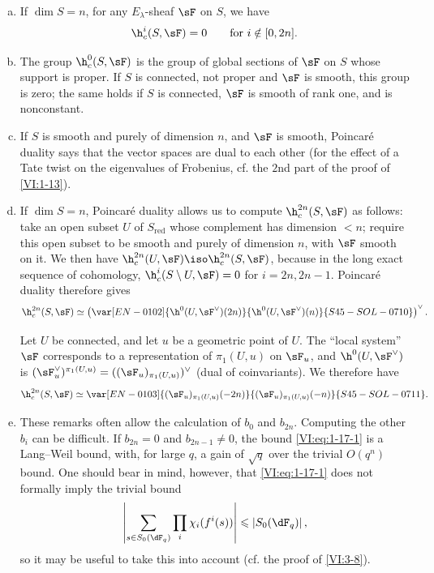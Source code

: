 \begin{enumerate}[a)]
  \item If $\dim S=n$, for any $E_\lambda$-sheaf $\sF$ on $S$, we have 
    \[
      \h_c^i(S,\sF) = 0 \qquad \text{for $i\notin [0,2n]$.}
    \]
  \item The group $\h_c^0(S,\sF)$ is the group of global sections of $\sF$ 
    on $S$ whose support is proper. If $S$ is connected, not proper and 
    $\sF$ is smooth, this group is zero; the same holds if $S$ is connected, 
    $\sF$ is smooth of rank one, and is nonconstant.
  \item If $S$ is smooth and purely of dimension $n$, and $\sF$ is smooth, 
    Poincaré duality says that the vector spaces 
     are dual to each other 
    (for the effect of a Tate twist on the eigenvalues of Frobenius, 
    cf. the $2$nd part of the proof of \ref{VI:1-13}).
  \item If $\dim S=n$, Poincaré duality allows us to compute 
    $\h_c^{2n}(S,\sF)$ as follows: take an open subset $U$ of $S_\text{red}$ 
    whose complement has dimension $<n$; require this open subset to be smooth and 
    purely of dimension $n$, with $\sF$ smooth on it. We then have 
    $\h_c^{2n}(U,\sF) \iso \h_c^{2n}(S,\sF)$, because in the long exact sequence 
    of cohomology, $\h_c^i(S\setminus U,\sF) = 0$ for $i=2n,2n-1$. 
    Poincaré duality therefore gives 
    \[
      \h_c^{2n}(S,\sF) \simeq \left(\var[EN-0102]{\h^0(U,\sF^\vee)(2n)}{\h^0(U,\sF^\vee)(n)}{S45-SOL-0710}\right)^\vee \text{.}
    \]
    
    Let $U$ be connected, and let $u$ be a geometric point of $U$. The 
    ``local system'' $\sF$ corresponds to a representation of 
    $\pi_1(U,u)$ on $\sF_u$, and $\h^0(U,\sF^\vee)$ is 
    $(\sF_u^\vee)^{\pi_1(U,u)}=((\sF_u)_{\pi_1(U,u)})^\vee$ (dual of 
    coinvariants). We therefore have 
\[
      \h_c^{2n}(S,\sF) \simeq \var[EN-0103]{(\sF_u)_{\pi_1(U,u)}(-2n)}{(\sF_u)_{\pi_1(U,u)}(-n)}{S45-SOL-0711} \text{.}
    \]
  \item These remarks often allow the calculation of $b_0$ and $b_{2n}$. 
    Computing the other $b_i$ can be difficult. If $b_{2n}=0$ and 
    $b_{2n-1}\ne 0$, the bound \eqref{VI:eq:1-17-1} is a Lang--Weil bound, 
    with, for large $q$, a gain of $\sqrt q$ over the 
    trivial $O(q^n)$ bound. One should bear in mind, however, that 
    \eqref{VI:eq:1-17-1} does not formally imply the trivial bound 
    \[
      \left|\sum_{s\in S_0(\dF_q)} \prod_i \chi_i(f^i(s))\right| \leqslant \left| S_0(\dF_q)\right| \text{,}
    \]
    so it may be useful to take this into account (cf. the proof of \ref{VI:3-8}). 
\end{enumerate}


